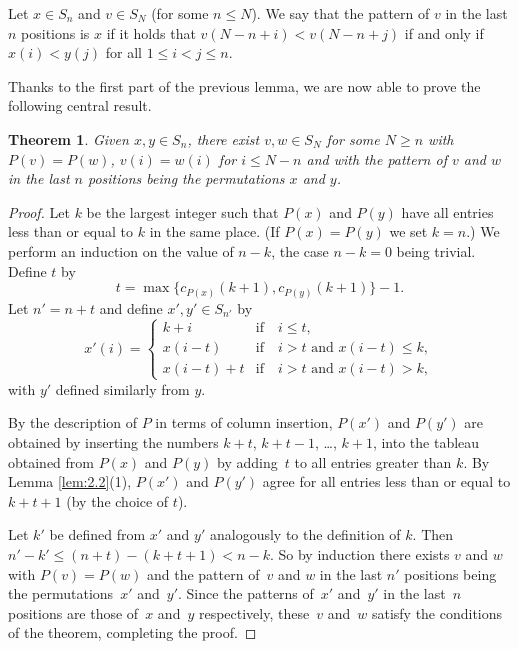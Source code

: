 \documentclass[10pt,a4paper]{amsart}
\numberwithin{equation}{section}
\newtheorem{Theorem}{Theorem}[section]
\begin{document}
Let $x\in S_n$ and $v\in S_N$ (for some $n\leq N$). We say that the pattern of $v$ in the last $n$ positions is $x$ if it holds that $v(N-n+i)<v(N-n+j)$ if and only if $x(i)<y(j)$ for all $1\leq i<j\leq n$.

Thanks to the first part of the previous lemma, we are now able to prove the following central result.


\begin{Theorem}\label{thm:asyouwish}
Given $x,y\in S_n$, there exist $v,w\in S_N$ for some $N\geq n$ with $P(v)=P(w)$, $v(i)=w(i)$ for $i\leq N-n$ and with the pattern of $v$ and $w$ in the last $n$ positions being the permutations $x$ and $y$.
\end{Theorem}
\begin{proof}Let $k$ be the largest integer such that $P(x)$ and $P(y)$ have all entries less than or equal to $k$ in the same place. (If $P(x)=P(y)$ we set $k=n$.) We perform an induction on the value of $n-k$, the case $n-k=0$ being trivial. Define $t$ by
\[
t=\max\{c_{P(x)}(k+1), c_{P(y)}(k+1)\}-1.
\]
Let $n'=n+t$ and define $x',y'\in S_{n'}$ by{\samepage
\begin{equation}\label{eq:prime}
x'(i)=\begin{cases}
k+i & \mbox{if}\quad i\leq t,\\
x(i-t) & \mbox{if}\quad i>t \mbox{ and } x(i-t)\leq k, \\
x(i-t)+t &\mbox{if}\quad i>t \mbox{ and } x(i-t)>k,
\end{cases}
\end{equation}
with $y'$ defined similarly from $y$.}


By the description of $P$ in terms of column insertion, $P(x')$ and $P(y')$ are obtained by inserting the numbers $k+t$, $k+t-1$, \dots, $k+1$, into the tableau obtained from $P(x)$ and $P(y)$ by adding~$t$ to all entries greater than $k$. By Lemma \ref{lem:2.2}(1), $P(x')$ and $P(y')$ agree for all entries less than or equal to $k+t+1$ (by the choice of $t$).

Let $k'$ be defined from $x'$ and $y'$ analogously to the definition of $k$. Then $n'-k'\leq (n+t)-(k+t+1)<n-k$. So by induction there exists $v$ and $w$ with $P(v)=P(w)$ and the pattern of~$v$ and $w$ in the last $n'$ positions being the permutations~$x'$ and~$y'$. Since the patterns of~$x'$ and~$y'$ in the last~$n$ positions are those of~$x$ and~$y$ respectively, these~$v$ and~$w$ satisfy the conditions of the theorem, completing the proof.
\end{proof}
\end{document}
